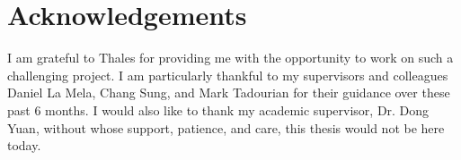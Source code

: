 \chapter*{Acknowledgements}
\thispagestyle{empty}

I am grateful to Thales for providing me with the opportunity to work on such a challenging project. I am particularly thankful to my supervisors and colleagues Daniel La Mela, Chang Sung, and Mark Tadourian for their guidance over these past 6 months. I would also like to thank my academic supervisor, Dr. Dong Yuan, without whose support, patience, and care, this thesis would not be here today. 





